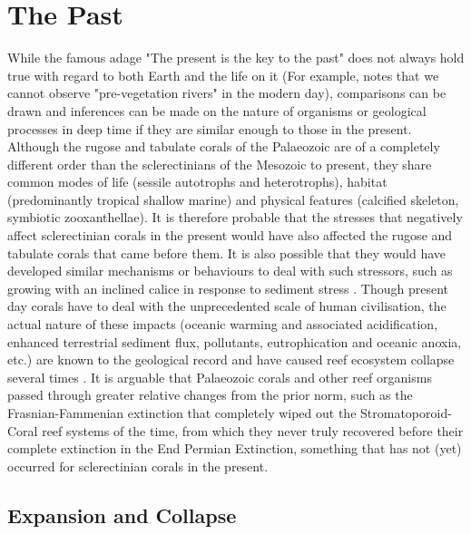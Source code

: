 \documentclass[11pt,a4paper]{article}
\begin{document}
\section{The Past}


While the famous adage "The present is the key to the past" \citep{Lyell_1837} does not always hold true with regard to both Earth and the life on it (For example, \cite{McMahon2018b} notes that we cannot observe "pre-vegetation rivers" in the modern day), comparisons can be drawn and inferences can be made on the nature of organisms or geological processes in deep time if they are similar enough to those in the present. Although the rugose and tabulate corals of the Palaeozoic are of a completely different order than the sclerectinians of the Mesozoic to present, they share common modes of life (sessile autotrophs and heterotrophs), habitat (predominantly tropical shallow marine) and physical features (calcified skeleton, symbiotic zooxanthellae). It is therefore probable that the stresses that negatively affect sclerectinian corals in the present would have also affected the rugose and tabulate corals that came before them.  It is also possible that they would have developed similar mechanisms or behaviours to deal with such stressors, such as growing with an inclined calice in response to sediment stress \citep{Logan1988}. Though present day corals have to deal with the unprecedented scale of human civilisation, the actual nature of these impacts (oceanic warming and associated acidification, enhanced terrestrial sediment flux, pollutants, eutrophication and oceanic anoxia, etc.) are known to the geological record and have caused reef ecosystem collapse several times \citep{Lipps2016photosynthesis}. It is arguable that Palaeozoic corals and other reef organisms passed through greater relative changes from the prior norm, such as the Frasnian-Fammenian extinction that completely wiped out the Stromatoporoid-Coral reef systems of the time, from which they never truly recovered before their complete extinction in the End Permian Extinction, something that has not (yet) occurred for sclerectinian corals in the present. 


\subsection{Expansion and Collapse}
\end{document}
